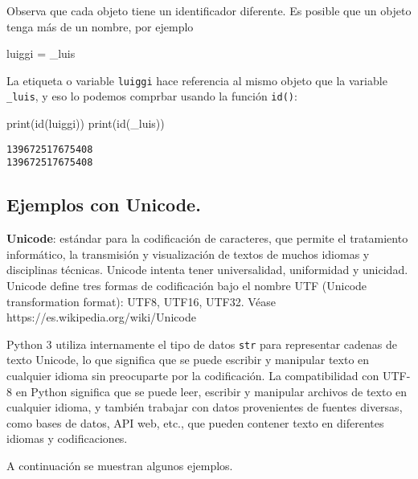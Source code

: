 \documentclass[
  letterpaper,
  DIV=11,
  numbers=noendperiod]{scrreprt}
\newenvironment{Shaded}{\begin{snugshade}}{\end{snugshade}}
\newcommand{\BuiltInTok}[1]{\textcolor[rgb]{0.00,0.23,0.31}{#1}}
\newcommand{\NormalTok}[1]{\textcolor[rgb]{0.00,0.23,0.31}{#1}}
\newcommand{\OperatorTok}[1]{\textcolor[rgb]{0.37,0.37,0.37}{#1}}
\begin{document}
Observa que cada objeto tiene un identificador diferente. Es posible que
un objeto tenga más de un nombre, por ejemplo

\begin{Shaded}
\begin{Highlighting}[]
\NormalTok{luiggi }\OperatorTok{=}\NormalTok{ \_luis }
\end{Highlighting}
\end{Shaded}

La etiqueta o variable \texttt{luiggi} hace referencia al mismo objeto
que la variable \texttt{\_luis}, y eso lo podemos comprbar usando la
función \texttt{id()}:

\begin{Shaded}
\begin{Highlighting}[]
\BuiltInTok{print}\NormalTok{(}\BuiltInTok{id}\NormalTok{(luiggi))}
\BuiltInTok{print}\NormalTok{(}\BuiltInTok{id}\NormalTok{(\_luis))}
\end{Highlighting}
\end{Shaded}

\begin{verbatim}
139672517675408
139672517675408
\end{verbatim}

\subsection{\texorpdfstring{\textbf{Ejemplos con
Unicode.}}{Ejemplos con Unicode.}}\label{ejemplos-con-unicode.}

\textbf{Unicode}: estándar para la codificación de caracteres, que
permite el tratamiento informático, la transmisión y visualización de
textos de muchos idiomas y disciplinas técnicas. Unicode intenta tener
universalidad, uniformidad y unicidad. Unicode define tres formas de
codificación bajo el nombre UTF (Unicode transformation format): UTF8,
UTF16, UTF32. Véase https://es.wikipedia.org/wiki/Unicode

Python 3 utiliza internamente el tipo de datos \texttt{str} para
representar cadenas de texto Unicode, lo que significa que se puede
escribir y manipular texto en cualquier idioma sin preocuparte por la
codificación. La compatibilidad con UTF-8 en Python significa que se
puede leer, escribir y manipular archivos de texto en cualquier idioma,
y también trabajar con datos provenientes de fuentes diversas, como
bases de datos, API web, etc., que pueden contener texto en diferentes
idiomas y codificaciones.

A continuación se muestran algunos ejemplos.
\end{document}
